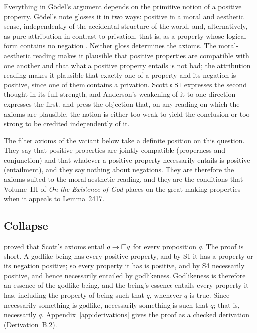 \documentclass{situationist-preprint}
\begin{document}
Everything in Gödel's argument depends on the primitive notion of a positive property. Gödel's note glosses it in two ways: positive in a moral and aesthetic sense, independently of the accidental structure of the world, and, alternatively, as pure attribution in contrast to privation, that is, as a property whose logical form contains no negation \citep{Godel1995}. Neither gloss determines the axioms. The moral-aesthetic reading makes it plausible that positive properties are compatible with one another and that what a positive property entails is not bad; the attribution reading makes it plausible that exactly one of a property and its negation is positive, since one of them contains a privation. Scott's S1 expresses the second thought in its full strength, and Anderson's weakening of it to one direction expresses the first. \citet{Oppy1995} and \citet{Sobel2004} press the objection that, on any reading on which the axioms are plausible, the notion is either too weak to yield the conclusion or too strong to be credited independently of it.

The filter axioms of the variant below take a definite position on this question. They say that positive properties are jointly compatible (properness and conjunction) and that whatever a positive property necessarily entails is positive (entailment), and they say nothing about negations. They are therefore the axioms suited to the moral-aesthetic reading, and they are the conditions that Volume~III of \emph{On the Existence of God} places on the great-making properties when it appeals to Lemma~2417.

\subsection{Collapse}

\citet{Sobel1987} proved that Scott's axioms entail $q \to \mathord{\Box} q$ for every proposition $q$. The proof is short. A godlike being has every positive property, and by S1 it has a property or its negation positive; so every property it has is positive, and by S4 necessarily positive, and hence necessarily entailed by godlikeness. Godlikeness is therefore an essence of the godlike being, and the being's essence entails every property it has, including the property of being such that $q$, whenever $q$ is true. Since necessarily something is godlike, necessarily something is such that $q$; that is, necessarily $q$. Appendix~\ref{app:derivations} gives the proof as a checked derivation (Derivation~B.2).
\end{document}
